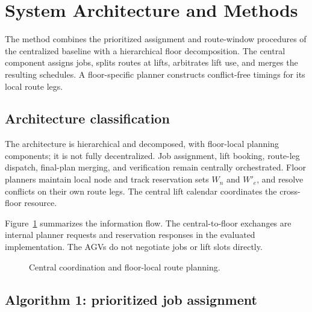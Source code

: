 \section{System Architecture and Methods}
\label{sec:methods}

The method combines the prioritized assignment and route-window procedures of
the centralized baseline \cite{guo2024} with a hierarchical floor decomposition.
The central component assigns jobs, splits routes at lifts, arbitrates lift
use, and merges the resulting schedules. A floor-specific planner constructs
conflict-free timings for its local route legs.

\subsection{Architecture classification}

The architecture is hierarchical and decomposed, with floor-local planning
components; it is not fully decentralized. Job assignment, lift booking,
route-leg dispatch, final-plan merging, and verification remain centrally
orchestrated. Floor planners maintain local node and track reservation sets
$W_n$ and $W'_e$, and resolve conflicts on their own route legs. The central
lift calendar coordinates the cross-floor resource.

Figure~\ref{fig:architecture-flow} summarizes the information flow. The
central-to-floor exchanges are internal planner requests and reservation
responses in the evaluated implementation. The AGVs do not negotiate jobs or
lift slots directly.

\begin{figure}[t]
\centering
{}
\caption{Central coordination and floor-local route planning.}
\label{fig:architecture-flow}
\end{figure}

\subsection{Algorithm 1: prioritized job assignment}

